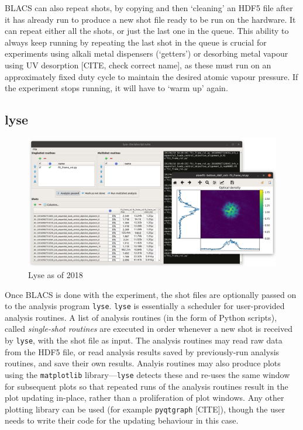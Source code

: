 BLACS can also repeat shots, by copying and then `cleaning' an HDF5 file after it has already run to produce a new shot file ready to be run on the hardware. It can repeat either all the shots, or just the last one in the queue. This ability to always keep running by repeating the last shot in the queue is crucial for experiments using alkali metal dispensers (`getters') or desorbing metal vapour using UV desorption [CITE, check correct name], as these must run on an approximately fixed duty cycle to maintain the desired atomic vapour pressure. If the experiment stops running, it will have to `warm up' again.

\subsection{lyse}
\begin{figure}
\begin{center}
\includegraphics[width=\textwidth]{figures/software/new_screenshots/lyse.png}
\caption{Lyse as of 2018}\label{fig:lyse}
\end{center}
\end{figure}

Once BLACS is done with the experiment, the shot files are optionally passed on to the analysis program \texttt{lyse}. \texttt{lyse} is essentially a scheduler for user-provided analysis routines. A list of analysis routines (in the form of Python scripts), called \emph{single-shot routines} are executed in order whenever a new shot is received by \texttt{lyse}, with the shot file as input. The analysis routines may read raw data from the HDF5 file, or read analysis results saved by previously-run analysis routines, and save their own results. Analyis routines may also produce plots using the \texttt{matplotlib} library---\texttt{lyse} detects these and re-uses the same window for subsequent plots so that repeated runs of the analysis routines result in the plot updating in-place, rather than a proliferation of plot windows. Any other plotting library can be used (for example \texttt{pyqtgraph} [CITE]), though the user needs to write their code for the updating behaviour in this case.

